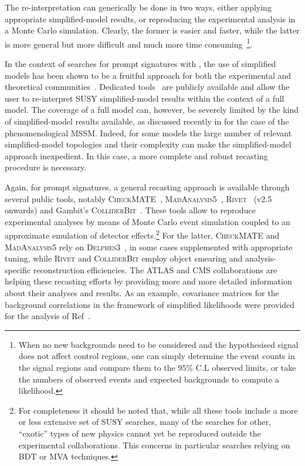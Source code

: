 The re-interpretation can generically be done in two ways, either applying
appropriate simplified-model results, or reproducing the experimental analysis in a Monte Carlo simulation. Clearly,  the former is easier and faster, 
while the latter is more general but more difficult and much more time consuming~\footnote{When no new backgrounds 
need to be considered and the hypothesised signal does not affect control regions, one can simply determine the 
event counts in the signal regions and compare them to the $95\%$ C.L observed limits, or take the numbers of observed events and expected backgrounds to compute a likelihood.}. 

In the context of searches for prompt signatures with \MET, the use of simplified models has been shown to be a fruitful approach for both the experimental and theoretical communities~\cite{hep-ph/0703088, 0810.3921, 1105.2838, Okawa:2011xg,1301.2175,Boveia:2016mrp}. 
Dedicated tools~\cite{Kraml:2013mwa,Ambrogi:2017neo,Papucci:2014rja} are publicly 
available and allow the user to re-interpret SUSY simplified-model results within the context of a full model.
The coverage of a full model can, however, be severely limited by the kind of simplified-model results available, 
as discussed recently in \cite{Ambrogi:2017lov} for the case of the phenomenological MSSM.
Indeed, for some models the large number of relevant simplified-model topologies and their complexity
can make the simplified-model approach inexpedient. 
In this case, a more complete and robust recasting procedure is necessary. 

Again, for prompt signatures, a general recasting approach is available through several public 
tools, notably \textsc{CheckMATE}~\cite{Drees:2013wra,Dercks:2016npn}, \textsc{MadAnalysis5}~\cite{Conte:2014zja,Dumont:2014tja}, 
\textsc{Rivet}~{\bf\cite{Buckley:2010ar}} (v2.5 onwards) and Gambit's \textsc{ColliderBit}~\cite{Balazs:2017moi}.
These tools allow to reproduce experimental analyses by means of Monte Carlo event simulation coupled to 
an approximate emulation of detector effects.\footnote{For completeness it should be noted that, while all these tools include a more or less 
extensive set of SUSY searches, many of the searches for other, ``exotic'' types of new physics cannot yet be reproduced outside the experimental collaborations. This concerns in particular searches relying on BDT or MVA techniques.} 
For the latter, \textsc{CheckMATE} and \textsc{MadAnalysis5} rely on \textsc{Delphes3}~\cite{deFavereau:2013fsa}, 
in some cases supplemented with appropriate tuning, 
while \textsc{Rivet} and \textsc{ColliderBit} employ object smearing and analysis-specific reconstruction efficiencies. 
The ATLAS and CMS collaborations are helping these recasting efforts by providing more and more 
detailed information about their analyses and results. As an example, covariance matrices for the background correlations in the framework of simplified likelihoods were provided for the analysis of Ref~\cite{CMS-NOTE-2017-001}.

